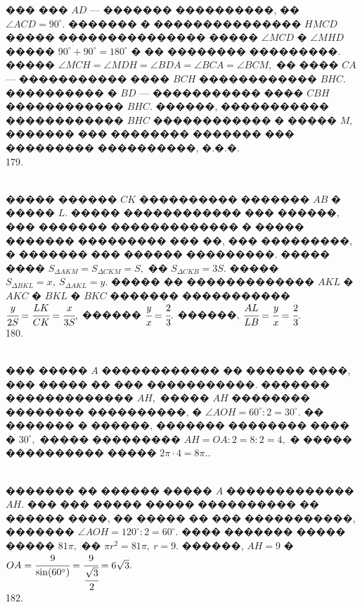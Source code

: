 \documentclass[12pt]{article}
\begin{document}
��� ��� $AD$ --- ������� ����������, �� $ \angle ACD = 90^\circ.$ ������� � ��������������� $HMCD$ ����� ��������������� ����� $\angle MCD$ � $\angle MHD$ ����� $90^\circ+90^\circ=180^\circ$ � �� �������� ���������. ����� $\angle MCH = \angle MDH = \angle BDA =  \angle BCA =  \angle BCM,$
�� ���� $CA$ --- ����������� ���� $BCH$ ������������ $BHC.$
���������� � $BD$ --- ����������� ���� $CBH$ ������������ $BHC.$ ������, ����������� ������������ $BHC$ ������������ � ����� $M,$ ������� ��� �������� ������� ��� ��������� ����������, �.�.�.\\
179. \begin{figure}[ht!]
\end{figure}\\
����� ������ $CK$ ���������� ������� $AB$ � ����� $L.$ ����� ������������ ��� ������, ��� ������� ������������� � ����� ������� ��������� ��� ��, ��� ���������, � ������� ��� ������ ���������. ����� ���� $S_{\Delta AKM}=S_{\Delta CKM}=S,$ �� $S_{\Delta CKB}=3S.$ ����� $S_{\Delta BKL}=x,\ S_{\Delta AKL}=y.$ ����� �� ������������� $AKL$ � $AKC$ � $BKL$ � $BKC$ ������� ����������� $\cfrac{y}{2S}=\cfrac{LK}{CK}=\cfrac{x}{3S},$ ������ $\cfrac{y}{x}=\cfrac{2}{3}.$ ������, $\cfrac{AL}{LB}=\cfrac{y}{x}=\cfrac{2}{3}.$\\
180. \begin{figure}[ht!]
\end{figure}\\
��� ����� $A$ ������������ �� ������ ����, ��� ����� �� ��� �����������. ������� ������������� $AH,$ ����� $AH$ �������� �������� ����������, � $\angle AOH=60^\circ:2=30^\circ.$ �� ������� � ������, ������� �������� ���� � $30^\circ,$ ����� ��������� $AH=OA:2=8:2=4,$ � ����� ���������� ����� $2\pi\cdot4=8\pi.$\newpage{}. \begin{figure}[ht!]
\end{figure}\\
������� �� ������ ����� $A$ ������������� $AH.$ ��� ��� ����� ����� ���������� �� ������ ����, �� ����� �� ��� �����������, ������� $\angle AOH=120^\circ:2=60^\circ.$ ���� ������� ����� ����� $81\pi,$ �� $\pi r^2=81\pi,\ r=9.$ ������, $AH=9$ � $OA=\cfrac{9}{\sin(60^\circ)}=\cfrac{9}{\cfrac{\sqrt{3}}{2}}=6\sqrt{3}.$\\
182. \begin{figure}[ht!]
\end{figure}\\
\end{document}
